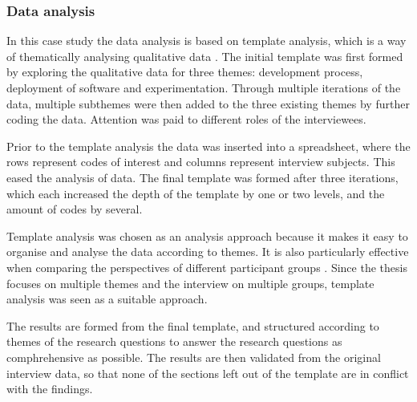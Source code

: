 \documentclass[english, grading]{tktltiki2}
\theoremstyle{definition}
\theoremstyle{remark}
\begin{document}
\subsubsection{Data analysis} %
In this case study the data analysis is based on template analysis, which is a way of thematically analysing qualitative data \cite{king1998template}. The initial template was first formed by exploring the qualitative data for three themes: development process, deployment of software and experimentation. Through multiple iterations of the data, multiple subthemes were then added to the three existing themes by further coding the data. Attention was paid to different roles of the interviewees.

Prior to the template analysis the data was inserted into a spreadsheet, where the rows represent codes of interest and columns represent interview subjects. This eased the analysis of data. The final template was formed after three iterations, which each increased the depth of the template by one or two levels, and the amount of codes by several.  

Template analysis was chosen as an analysis approach because it makes it easy to organise and analyse the data according to themes. It is also particularly effective when comparing the perspectives of different participant groups \cite{king2004using}. Since the thesis focuses on multiple themes and the interview on multiple groups, template analysis was seen as a suitable approach.

The results are formed from the final template, and structured according to themes of the research questions to answer the research questions as comphrehensive as possible. The results are then validated from the original interview data, so that none of the sections left out of the template are in conflict with the findings.

\end{document}

